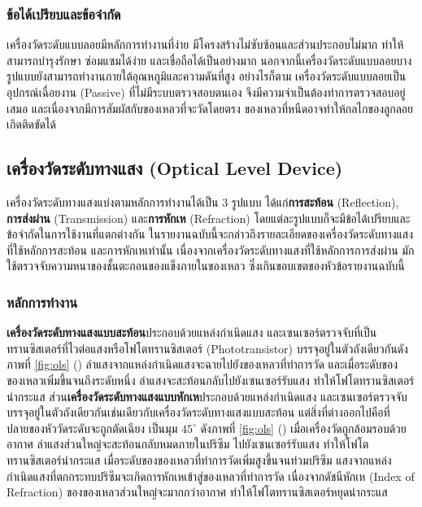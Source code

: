 \documentclass[final,11pt,a4paper]{article}
\begin{document}
\subsubsection{ข้อได้เปรียบและข้อจำกัด}
เครื่องวัดระดับแบบลอยมีหลักการทำงานที่ง่าย มีโครงสร้างไม่ซับซ้อนและส่วนประกอบไม่มาก ทำให้สามารถบำรุงรักษา ซ่อมแซมได้ง่าย และเชื่อถือได้เป็นอย่างมาก
นอกจากนี้เครื่องวัดระดับแบบลอยบางรูปแบบยังสามารถทำงานภายใต้อุณหภูมิและความดันที่สูง อย่างไรก็ตาม เครื่องวัดระดับแบบลอยเป็นอุปกรณ์เฉื่อยงาน (Passive) 
ที่ไม่มีระบบตรวจสอบตนเอง จึงมีความจำเป็นต้องทำการตรวจสอบอยู่เสมอ และเนื่องจากมีการสัมผัสกับของเหลวที่จะวัดโดยตรง ของเหลวที่หนืดอาจทำให้กลไกของลูกลอยเกิดติดขัดได้

\subsection{เครื่องวัดระดับทางแสง (Optical Level Device)}
เครื่องวัดระดับทางแสงแบ่งตามหลักการทำงานได้เป็น 3 รูปแบบ ได้แก่\textbf{การสะท้อน} (Reflection), \textbf{การส่งผ่าน} (Transmission) และ\textbf{การหักเห} (Refraction) 
โดยแต่ละรูปแบบก็จะมีข้อได้เปรียบและข้อจำกัดในการใช้งานที่แตกต่างกัน ในรายงานฉบับนี้จะกล่าวถึงรายละเอียดของเครื่องวัดระดับทางแสงที่ใช้หลักการสะท้อน 
และการหักเหเท่านั้น เนื่องจากเครื่องวัดระดับทางแสงที่ใช้หลักการการส่งผ่าน มักใช้ตรวจจับความหนาของชั้นตะกอนของแข็งภายในของเหลว 
ซึ่งเกินขอบเขตของหัวข้อรายงานฉบับนี้

\subsubsection{หลักการทำงาน}
\textbf{เครื่องวัดระดับทางแสงแบบสะท้อน}ประกอบด้วยแหล่งกำเนิดแสง และเซนเซอร์ตรวจจับที่เป็นทรานซิสเตอร์ที่ไวต่อแสงหรือโฟโตทรานซิสเตอร์ (Phototransistor) 
บรรจุอยู่ในตัวถังเดียวกันดังภาพที่ \ref{fig:ols} () ลำแสงจากแหล่งกำเนิดแสงจะฉายไปยังของเหลวที่ทำการวัด และเมื่อระดับของของเหลวเพิ่มขึ้นจนถึงระดับหนึ่ง 
ลำแสงจะสะท้อนกลับไปยังเซนเซอร์รับแสง ทำให้โฟโตทรานซิสเตอร์นำกระแส ส่วน\textbf{เครื่องวัดระดับทางแสงแบบหักเห}ประกอบด้วยแหล่งกำเนิดแสง 
และเซนเซอร์ตรวจจับ บรรจุอยู่ในตัวถังเดียวกันเช่นเดียวกับเครื่องวัดระดับทางแสงแบบสะท้อน แต่สิ่งที่ต่างออกไปคือที่ปลายของหัววัดระดับจะถูกตัดเฉียง
เป็นมุม $45^\circ$ ดังภาพที่ \ref{fig:ols} () เมื่อเครื่องวัดถูกล้อมรอบด้วยอากาศ ลำแสงส่วนใหญ่จะสะท้อนกลับหมดภายในปริซึม ไปยังเซนเซอร์รับแสง ทำให้โฟโตทรานซิสเตอร์นำกระแส
เมื่อระดับของของเหลวที่ทำการวัดเพิ่มสูงขึ้นจนท่วมปริซึม แสงจากแหล่งกำเนิดแสงที่ตกกระทบปริซึมจะเกิดการหักเหเข้าสู่ของเหลวที่ทำการวัด เนื่องจากดัชนีหักเห
(Index of Refraction) ของของเหลวส่วนใหญ่จะมากกว่าอากาศ ทำให้โฟโตทรานซิสเตอร์หยุดนำกระแส
\end{document}
